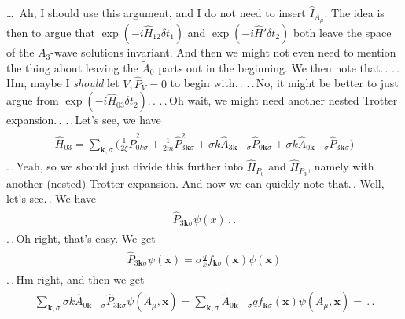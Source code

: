 \documentclass{report}
\begin{document}
\ldots\ Ah, I should use this argument, and I do not need to insert $\hat I_{A_\mu}$. The idea is then to argue that $\exp(-i \hat H_{12} \delta t_1)$ and $\exp(-i \hat H' \delta t_2)$ both leave the space of the $\tilde A_3$-wave solutions invariant. And then we might not even need to mention the thing about leaving the $\tilde A_0$ parts out in the beginning. We then note that.\,. .\,.\,Hm, maybe I \emph{should} let $V, \hat P_V = 0$ to begin with.\,. .\,.\,No, it might be better to just argue from $\exp(-i \hat H_{03} \delta t_2)$.\,. .\,.\,Oh wait, we might need another nested Trotter expansion.\,. 
.\,.\,Let's see, we have
\begin{align}
\begin{aligned}
	\hat H_{03} = 
		\sum_{\boldsymbol k, \sigma}\Big(
			\frac{1}{2\xi} \hat P^2_{0 k \sigma} +
			\frac{1}{2m} \hat P^2_{3 \boldsymbol k \sigma} +
			\sigma k \hat{A}_{3 \boldsymbol k -\sigma} \hat P_{0 \boldsymbol k \sigma} + 
			\sigma k \hat{A}_{0 \boldsymbol k -\sigma} \hat P_{3 \boldsymbol k \sigma} 
		\Big)
\end{aligned}
\end{align}
.\,.\,Yeah, so we should just divide this further into $\hat H_{ P_0}$ and $\hat H_{ P_3}$, namely with another (nested) Trotter expansion. And now we can quickly note that.\,. Well, let's see.\,. We have 
\begin{align}
\begin{aligned}
	\hat P_{3 \boldsymbol k \sigma} \psi(x)\,.\,.
\end{aligned}
\end{align}
.\,.\,Oh right, that's easy. We get
\begin{align}
\begin{aligned}
	\hat P_{3 \boldsymbol k \sigma} \psi(\boldsymbol{x}) = 
		\sigma\frac{q}{k}
		f_{\boldsymbol{k}\sigma}(\boldsymbol{x}) \psi(\boldsymbol{x})
\end{aligned}
\end{align}
.\,.\,Hm right, and then we get 
\begin{align}
\begin{aligned}
	\sum_{\boldsymbol k, \sigma} 
		\sigma k \hat{A}_{0 \boldsymbol k -\sigma} 
		\hat P_{3 \boldsymbol k \sigma} 
		\psi(\tilde A_\mu, \boldsymbol{x}) 
	= 
	\sum_{\boldsymbol k, \sigma}
		\tilde A_{0 \boldsymbol k -\sigma} 
		q f_{\boldsymbol{k}\sigma}(\boldsymbol{x}) 
		\psi(\tilde A_\mu, \boldsymbol{x})
	= 
	\,.\,.
\end{aligned}
\end{align}
\end{document}
